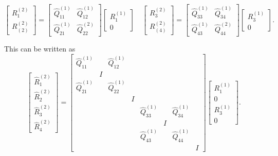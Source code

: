 \documentclass[a4paper, 12pt,oneside]{article}
\begin{document}
		$$
		\left[\begin{array}{c}
		R_1^{(2)} \\
		R_{(2)}^{(2)}
		\end{array}\right]=\left[\begin{array}{cc}
		\hat{Q}_{11}^{(1)} & \hat{Q}_{12}^{(1)} \\
		\hat{Q}_{21}^{(1)} & \hat{Q}_{22}^{(2)}
		\end{array}\right]\left[\begin{array}{c}
		R_1^{(1)} \\
		0
		\end{array}\right] \quad\left[\begin{array}{l}
		R_3^{(2)} \\
		R_{(4)}^{(2)}
		\end{array}\right]=\left[\begin{array}{ll}
		\hat{Q}_{33}^{(1)} & \hat{Q}_{34}^{(1)} \\
		\hat{Q}_{43}^{(1)} & \hat{Q}_{44}^{(2)}
		\end{array}\right]\left[\begin{array}{c}
		R_3^{(1)} \\
		0
		\end{array}\right] .
		$$
		
		This can be written as
		$$
		\left[\begin{array}{c}
		\hat{R}_1^{(2)} \\
		\hat{R}_2^{(2)} \\
		\hat{R}_3^{(2)} \\
		\hat{R}_4^{(2)}
		\end{array}\right]=\left[\begin{array}{cccccccc}
		\hat{Q}_{11}^{(1)} & & \hat{Q}_{12}^{(1)} & & & & & \\
		& I & & & & & & \\
		\hat{Q}_{21}^{(1)} & & \hat{Q}_{22}^{(1)} & & & & & \\
		& & & I & & & & \\
		& & & & \hat{Q}_{33}^{(1)} & & \hat{Q}_{34}^{(1)} & \\
		& & & & & I & & \\
		& & & & \hat{Q}_{43}^{(1)} & & \hat{Q}_{44}^{(1)} & \\
		& & & & & & & I
		\end{array}\right]\left[\begin{array}{c}
		R_1^{(1)} \\
		0 \\
		R_3^{(1)} \\
		0
		\end{array}\right] .
		$$
		
\end{document}
